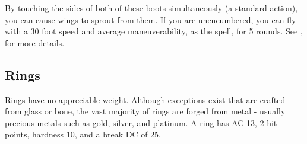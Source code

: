 
 By touching the sides of both of these boots simultaneously (a standard action), you can cause wings to sprout from them. If you are unencumbered, you can fly with a 30 foot speed and average maneuverability, as the  spell, for 5 rounds. See , for more details.


\subsection{Rings}

 Rings have no appreciable weight. Although exceptions exist that are crafted from glass or bone, the vast majority of rings are forged from metal - usually precious metals such as gold, silver, and platinum. A ring has AC 13, 2 hit points, hardness 10, and a break DC of 25.

\begin{comment}
\begin{dtable}
\lcaption{Rings}
\begin{tabularx}{\columnwidth}{>{\lcol}X l}
Ring & Market Price \\
Protection \plus1 & 2,000 gp \\
Feather falling & 2,200 gp \\
Climbing & 2,500 gp \\
Jumping & 2,500 gp \\
Sustenance & 2,500 gp \\
Swimming & 2,500 gp \\
Mind shielding & 8,000 gp \\
Protection \plus2 & 8,000 gp \\
Climbing, improved & 10,000 gp \\
Jumping, improved & 10,000 gp \\
Swimming, improved & 10,000 gp \\
Energy resistance, minor & 12,000 gp \\
Protection \plus3 & 18,000 gp \\
Energy resistance, major & 28,000 gp \\
Protection \plus4 & 32,000 gp \\
Energy resistance, greater & 44,000 gp \\
Protection \plus5 & 50,000 gp \\
\end{tabularx}
\end{dtable}
\end{comment}

